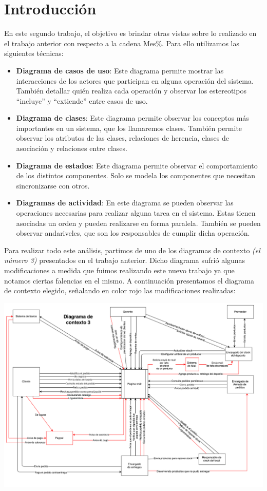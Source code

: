 \section{Introducci\'on}

En este segundo trabajo, el objetivo es brindar otras vistas sobre lo realizado en el trabajo anterior con respecto a la cadena Mes\%. Para ello utilizamos las siguientes técnicas: 

\begin{itemize}
\item \textbf{Diagrama de casos de uso}: Este diagrama permite mostrar las interacciones de los actores que participan en alguna operación del sistema. También detallar quién realiza cada operación y observar los estereotipos “incluye” y “extiende” entre casos de uso.
\item \textbf{Diagrama de clases}: Este diagrama permite observar los conceptos más importantes en un sistema, que los llamaremos clases. También permite observar los atributos de las clases, relaciones de herencia, clases de asociación y relaciones entre clases.
\item \textbf{Diagrama de estados}: Este diagrama permite observar el comportamiento de los distintos componentes. Solo se modela los componentes que necesitan sincronizarse con otros.
\item \textbf{Diagramas de actividad}: En este diagrama se pueden observar las operaciones necesarias para realizar alguna tarea en el sistema. Estas tienen asociadas un orden y pueden realizarse en forma paralela. También se pueden observar andariveles, que son los responsables de cumplir dicha operación.
\end{itemize}



Para realizar todo este análisis, partimos de uno de los diagramas de contexto \textit{(el número 3)} presentados en el trabajo anterior. Dicho diagrama sufrió algunas modificaciones a medida que fuimos realizando este nuevo trabajo ya que notamos ciertas falencias en el mismo. A continuación presentamos el diagrama de contexto elegido, señalando en color rojo las modificaciones realizadas:

\includegraphics[scale=0.5, angle=90]{secciones/diagramaContexto}